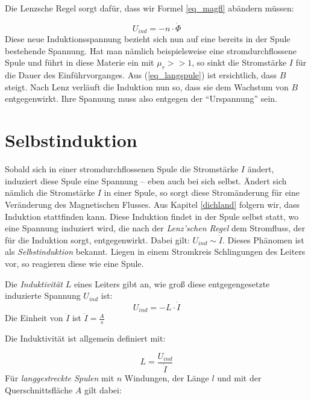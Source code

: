 Die Lenzsche Regel sorgt dafür, dass wir Formel \ref{eq_magfl} abändern müssen:

\begin{equation}
U_{ind} = - n \cdot \dot{\Phi}
\label{eq_lenz}
\end{equation}
Diese neue Induktionsspannung bezieht sich nun auf eine bereits in der Spule bestehende Spannung. Hat man nämlich beispielsweise eine stromdurchflossene Spule und führt in diese Materie ein mit \(\mu_r >> 1\), so sinkt die Stromstärke \(I\) für die Dauer des Einführvorganges. Aus (\ref{eq_langspule}) ist ersichtlich, dass \(B\) steigt. Nach Lenz verläuft die Induktion nun so, dass sie dem Wachstum von \(B\) entgegenwirkt. Ihre Spannung muss also entgegen der "`Urspannung"' sein.

		\section{Selbstinduktion}
		\label{selbstind}

Sobald sich in einer stromdurchflossenen Spule die Stromstärke \(I\) ändert, induziert diese Spule eine Spannung -- eben auch bei sich selbst. Ändert sich nämlich die Stromstärke \(I\) in einer Spule, so sorgt diese Stromänderung für eine Veränderung des Magnetischen Flusses. Aus Kapitel \ref{dichland} folgern wir, dass Induktion stattfinden kann. Diese Induktion findet in der Spule selbst statt, wo eine Spannung induziert wird, die nach der \textit{Lenz'schen Regel} dem Stromfluss, der für die Induktion sorgt, entgegenwirkt. Dabei gilt: \(U_{ind} \sim \dot{I}\). Dieses Phänomen ist als \textit{Selbstinduktion} bekannt. Liegen in einem Stromkreis Schlingungen des Leiters vor, so reagieren diese wie eine Spule.

Die \textit{Induktivität} \(L\) eines Leiters gibt an, wie groß diese entgegengesetzte induzierte Spannung \(U_{ind}\) ist: 
\begin{equation}
U_{ind} = - L \cdot \dot{I}
\label{ind_spule}
\end{equation}
Die Einheit von \(\dot{I}\) ist \(\dot{I} = \frac{A}{s}\)


Die Induktivität ist allgemein definiert mit:

\begin{equation}
L = \frac{U_{ind}}{\dot{I}}
\end{equation}
Für \textit{langgestreckte Spulen} mit \(n\) Windungen, der Länge \(l\) und mit der Querschnittsfläche \(A\) gilt dabei:

